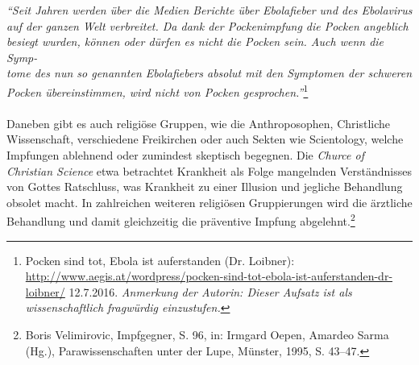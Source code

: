 \documentclass[
    a4paper,
    12pt,
    hyphens,
    chapterprefix=true,
    headheight=33pt,
    footheight=29pt,
    headings=optiontohead,
]{scrartcl}
\begin{document}
\textit{"`Seit Jahren werden über die Medien Berichte über Ebolafieber und des Ebolavirus auf der ganzen Welt verbreitet. Da dank der Pockenimpfung die Pocken angeblich besiegt wurden, können oder dürfen es nicht die Pocken sein. Auch wenn die Symp-\\tome des nun so genannten Ebolafiebers absolut mit den Symptomen der schweren Pocken übereinstimmen, wird nicht von Pocken gesprochen."'}\footnote{Pocken sind tot, Ebola ist auferstanden (Dr. Loibner): \url{http://www.aegis.at/wordpress/pocken-sind-tot-ebola-ist-auferstanden-dr-loibner/} 12.7.2016. \textit{Anmerkung der Autorin: Dieser Aufsatz ist als wissenschaftlich fragwürdig einzustufen.}}\\
\\
Daneben gibt es auch religiöse Gruppen, wie die Anthroposophen, Christliche Wissenschaft, verschiedene Freikirchen oder auch Sekten wie Scientology, welche Impfungen ablehnend oder zumindest skeptisch begegnen. Die \textit{Churce of Christian Science} etwa betrachtet Krankheit als Folge mangelnden Verständnisses von Gottes Ratschluss, was Krankheit zu einer Illusion und jegliche Behandlung obsolet macht. In zahlreichen weiteren religiösen Gruppierungen wird die ärztliche Behandlung und damit gleichzeitig die präventive Impfung abgelehnt.\footnote{Boris Velimirovic, Impfgegner, S. 96, in: Irmgard Oepen, Amardeo Sarma (Hg.), Parawissenschaften unter der Lupe, Münster, 1995, S. 43--47.}
\end{document}
